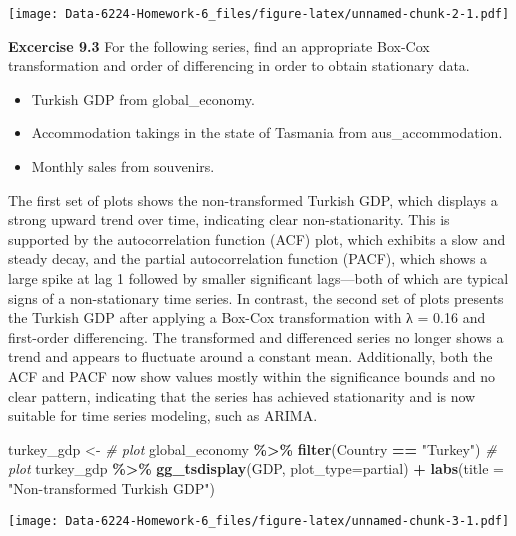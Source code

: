 \documentclass[
]{article}
\newenvironment{Shaded}{\begin{snugshade}}{\end{snugshade}}
\newcommand{\AttributeTok}[1]{\textcolor[rgb]{0.13,0.29,0.53}{#1}}
\newcommand{\CommentTok}[1]{\textcolor[rgb]{0.56,0.35,0.01}{\textit{#1}}}
\newcommand{\FunctionTok}[1]{\textcolor[rgb]{0.13,0.29,0.53}{\textbf{#1}}}
\newcommand{\NormalTok}[1]{#1}
\newcommand{\OtherTok}[1]{\textcolor[rgb]{0.56,0.35,0.01}{#1}}
\newcommand{\SpecialCharTok}[1]{\textcolor[rgb]{0.81,0.36,0.00}{\textbf{#1}}}
\newcommand{\StringTok}[1]{\textcolor[rgb]{0.31,0.60,0.02}{#1}}
\providecommand{\tightlist}{%
  \setlength{\itemsep}{0pt}\setlength{\parskip}{0pt}}
\begin{document}
\texttt{[image: Data-6224-Homework-6\_files/figure-latex/unnamed-chunk-2-1.pdf]}

\textbf{Excercise 9.3} For the following series, find an appropriate
Box-Cox transformation and order of differencing in order to obtain
stationary data.

\begin{itemize}
\tightlist
\item
  Turkish GDP from global\_economy.
\item
  Accommodation takings in the state of Tasmania from
  aus\_accommodation.
\item
  Monthly sales from souvenirs.
\end{itemize}

The first set of plots shows the non-transformed Turkish GDP, which
displays a strong upward trend over time, indicating clear
non-stationarity. This is supported by the autocorrelation function
(ACF) plot, which exhibits a slow and steady decay, and the partial
autocorrelation function (PACF), which shows a large spike at lag 1
followed by smaller significant lags---both of which are typical signs
of a non-stationary time series. In contrast, the second set of plots
presents the Turkish GDP after applying a Box-Cox transformation with λ
= 0.16 and first-order differencing. The transformed and differenced
series no longer shows a trend and appears to fluctuate around a
constant mean. Additionally, both the ACF and PACF now show values
mostly within the significance bounds and no clear pattern, indicating
that the series has achieved stationarity and is now suitable for time
series modeling, such as ARIMA.

\begin{Shaded}
\begin{Highlighting}[]
\NormalTok{turkey\_gdp }\OtherTok{\textless{}{-}} \CommentTok{\# plot}
\NormalTok{  global\_economy }\SpecialCharTok{\%\textgreater{}\%}
  \FunctionTok{filter}\NormalTok{(Country }\SpecialCharTok{==} \StringTok{"Turkey"}\NormalTok{)}
\CommentTok{\# plot}
\NormalTok{turkey\_gdp }\SpecialCharTok{\%\textgreater{}\%}
  \FunctionTok{gg\_tsdisplay}\NormalTok{(GDP, }\AttributeTok{plot\_type=}\StringTok{\textquotesingle{}partial\textquotesingle{}}\NormalTok{) }\SpecialCharTok{+}
  \FunctionTok{labs}\NormalTok{(}\AttributeTok{title =} \StringTok{"Non{-}transformed Turkish GDP"}\NormalTok{)}
\end{Highlighting}
\end{Shaded}

\texttt{[image: Data-6224-Homework-6\_files/figure-latex/unnamed-chunk-3-1.pdf]}
\end{document}
